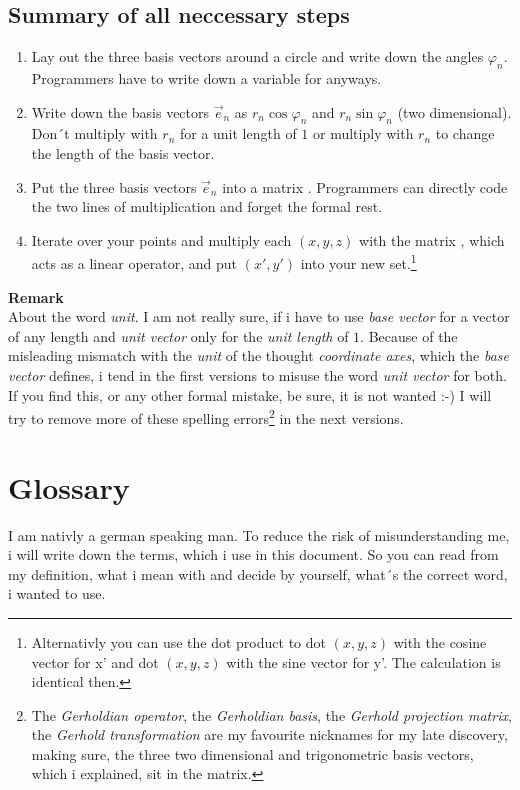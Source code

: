 \documentclass[a4paper]{article}
\begin{document}
\subsection{Summary of all neccessary steps}
\begin{enumerate}
\item Lay out the three basis vectors around a circle and write down the angles $\varphi_{n}$. Programmers have to write down a variable for anyways.
\item Write down the basis vectors $\vec{e}_{n}$ as $r_{n} \cos \varphi_{n}$ and $r_{n} \sin \varphi_{n}$ (two dimensional). Don´t multiply with $r_{n}$ for a unit length of $1$ or multiply with $r_{n}$ to change the length of the basis vector.
\item Put the three basis vectors $\vec{e}_{n}$ into a matrix . Programmers can directly code the two lines of multiplication and forget the formal rest.
\item Iterate over your points and multiply each $(x,y,z)$ with the matrix , which acts as a linear operator, and put $(x',y')$ into your new set.\footnote{Alternativly you can use the dot product to dot $(x,y,z)$ with the cosine vector for x' and dot $(x,y,z)$ with the sine vector for y'. The calculation is identical then.}
\end{enumerate}

\textbf{Remark}\\
About the word \emph{unit}. I am not really sure, if i have to use \emph{base vector} for a vector of any length and \emph{unit vector} only for the \emph{unit length} of $1$. Because of the misleading mismatch with the \emph{unit} of the thought \emph{coordinate axes}, which the \emph{base vector} defines, i tend in the first versions to misuse the word \emph{unit vector} for both. If you find this, or any other formal mistake, be sure, it is not wanted :-) I will try to remove more of these spelling errors\footnote{The \emph{Gerholdian operator}, the \emph{Gerholdian basis}, the \emph{Gerhold projection matrix}, the \emph{Gerhold transformation} are my favourite nicknames for my late discovery, making sure, the three two dimensional and trigonometric basis vectors, which i explained, sit in the matrix.} in the next versions.
\section{Glossary}

I am nativly a german speaking man. To reduce the risk of misunderstanding me, i will write down the terms, which i use in this document. So you can read from my definition, what i mean with and decide by yourself, what´s the correct word, i wanted to use.\\
\end{document}
